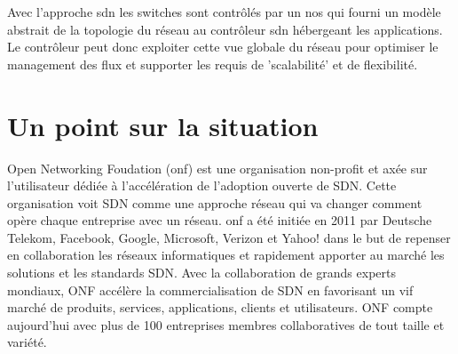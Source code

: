 Avec l'approche \gls{sdn} les switches sont contrôlés par un \gls{nos} qui fourni un modèle abstrait de la topologie du réseau au contrôleur \gls{sdn} hébergeant les applications. Le contrôleur peut donc exploiter cette vue globale du réseau pour optimiser le management des flux et supporter les requis de 'scalabilité' et de flexibilité. \cite{WhySDN}


\clearpage



\section{Un point sur la situation}




Open Networking Foudation (\gls{onf}) est une organisation non-profit et axée sur l'utilisateur dédiée à l'accélération de l'adoption ouverte de SDN. Cette organisation voit SDN comme une approche réseau qui va changer comment opère chaque entreprise avec un réseau.
\gls{onf} a été initiée en 2011 par Deutsche Telekom, Facebook, Google, Microsoft, Verizon et Yahoo! dans le but de repenser en collaboration les réseaux informatiques et rapidement apporter au marché les solutions et les standards SDN. Avec la collaboration de  grands experts mondiaux, ONF accélère la commercialisation de SDN en favorisant un vif marché de produits, services, applications, clients et utilisateurs. ONF compte aujourd'hui avec plus de 100 entreprises membres collaboratives de tout taille et variété. \cite{ONFOverview}

